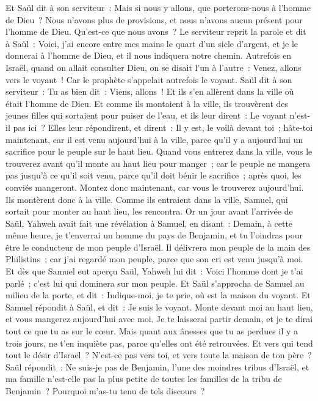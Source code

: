 \begin{multicols}{2}
Et Saül dit à son serviteur~: Mais si nous y allons, que porterons-nous à l'homme de Dieu~? Nous n'avons plus de provisions, et nous n'avons aucun présent pour l'homme de Dieu. Qu'est-ce que nous avons~?
Le serviteur reprit la parole et dit à Saül~: Voici, j'ai encore entre mes mains le quart d'un sicle d'argent, et je le donnerai à l'homme de Dieu, et il nous indiquera notre chemin.
Autrefois en Israël, quand on allait consulter Dieu, on se disait l'un à l'autre~: Venez, allons vers le voyant~! Car le prophète s'appelait autrefois le voyant.
Saül dit à son serviteur~: Tu as bien dit~: Viens, allons~! Et ils s'en allèrent dans la ville où était l'homme de Dieu.
Et comme ils montaient à la ville, ils trouvèrent des jeunes filles qui sortaient pour puiser de l'eau, et ils leur dirent~: Le voyant n'est-il pas ici~?
Elles leur répondirent, et dirent~: Il y est, le voilà devant toi~; hâte-toi maintenant, car il est venu aujourd'hui à la ville, parce qu'il y a aujourd'hui un sacrifice pour le peuple sur le haut lieu.
Quand vous entrerez dans la ville, vous le trouverez avant qu'il monte au haut lieu pour manger~; car le peuple ne mangera pas jusqu'à ce qu'il soit venu, parce qu'il doit bénir le sacrifice~; après quoi, les conviés mangeront. Montez donc maintenant, car vous le trouverez aujourd'hui.
Ils montèrent donc à la ville. Comme ils entraient dans la ville, Samuel, qui sortait pour monter au haut lieu, les rencontra.
Or un jour avant l'arrivée de Saül, Yahweh avait fait une révélation à Samuel, en disant~:
Demain, à cette même heure, je t'enverrai un homme du pays de Benjamin, et tu l'oindras pour être le conducteur de mon peuple d'Israël. Il délivrera mon peuple de la main des Philistins~; car j'ai regardé mon peuple, parce que son cri est venu jusqu'à moi.
Et dès que Samuel eut aperçu Saül, Yahweh lui dit~: Voici l'homme dont je t'ai parlé~; c'est lui qui dominera sur mon peuple.
Et Saül s'approcha de Samuel au milieu de la porte, et dit~: Indique-moi, je te prie, où est la maison du voyant.
Et Samuel répondit à Saül, et dit~: Je suis le voyant. Monte devant moi au haut lieu, et vous mangerez aujourd'hui avec moi. Je te laisserai partir demain, et je te dirai tout ce que tu as sur le cœur.
Mais quant aux ânesses que tu as perdues il y a trois jours, ne t'en inquiète pas, parce qu'elles ont été retrouvées. Et vers qui tend tout le désir d'Israël~? N'est-ce pas vers toi, et vers toute la maison de ton père~?
Saül répondit~: Ne suis-je pas de Benjamin, l'une des moindres tribus d'Israël, et ma famille n'est-elle pas la plus petite de toutes les familles de la tribu de Benjamin~? Pourquoi m'as-tu tenu de tels discours~?

\end{multicols}
